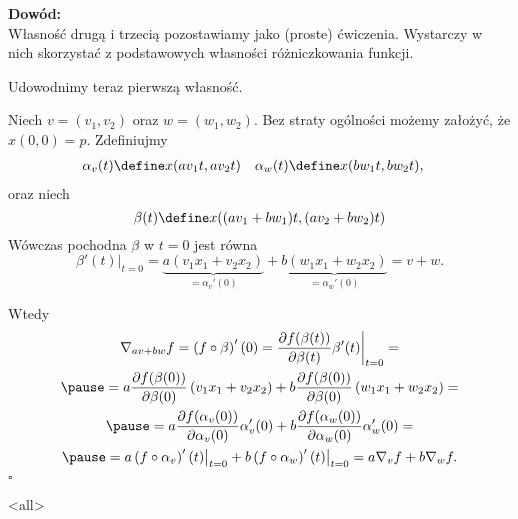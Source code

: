 \begin{frame}[<+->]

\textcolor{ared}{\textbf{Dowód: }}\\\pause 
Własność drugą i trzecią pozostawiamy jako (proste) ćwiczenia. Wystarczy w nich skorzystać z podstawowych własności różniczkowania funkcji.

Udowodnimy teraz pierwszą własność. 

\pause Niech $v=(v_1, v_2)$ oraz $w=(w_1,w_2)$. Bez straty ogólności możemy założyć, że $x(0,0)=p$. \pause Zdefiniujmy 
\begin{align*}
\alpha_v(t)\define&{x(av_1t,av_2t)}& \alpha_w(t)\define &x(bw_1t,bw_2t),
\end{align*}
oraz niech
\[\beta(t)\define x((av_1+bw_1)t,(av_2+bw_2)t)\] %
\pause Wówczas pochodna $\beta$ w $t=0$ jest równa 
\[\beta'(t)\big|_{t=0}=
\underbrace{a(v_1x_1+v_2x_2)}_{=\alpha_v'(0)}+\underbrace{b(w_1x_1+w_2x_2)}_{=\alpha_w'(0)}=v+w.\]

\end{frame}
\begin{frame}[<+->]

Wtedy 
\begin{multline*}
\nabla_{av+bw}f=\left(f\circ \beta\right)'(0)=\frac{\partial f(\beta(t))}{\partial \beta(t)}\beta'(t)\bigg|_{t=0}=\\\pause
=a\frac{\partial f(\beta(0))}{\partial \beta(0)}\left(v_1 x_1+v_2 x_2\right)+b\frac{\partial f(\beta(0))}{\partial \beta(0)}\left(w_1 x_1+w_2 x_2\right)=\\\pause
=a\frac{\partial f(\alpha_v(0))}{\partial \alpha_v(0)}\alpha_v'(0)+b\frac{\partial f(\alpha_w(0))}{\partial \alpha_w(0)}\alpha_w'(0)=\\\pause
=a\left(f\circ \alpha_v\right)'(t)\big|_{t=0}+b\left(f\circ 
\alpha_w\right)'(t)\big|_{t=0}=a\nabla_vf+b\nabla_wf.
\end{multline*}
\hfill $\square$

\end{frame}
\mode<all>{}
